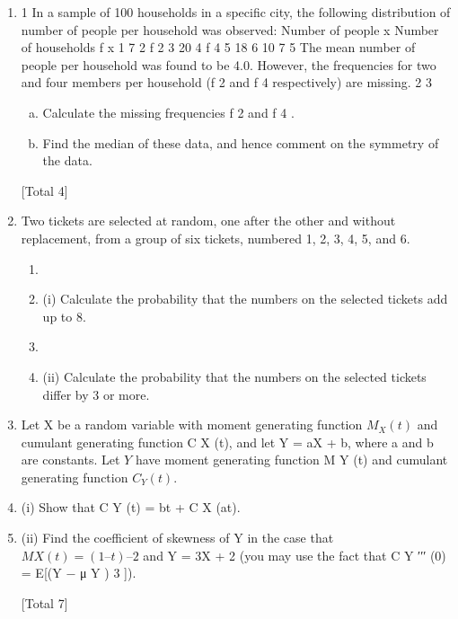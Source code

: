 \documentclass[a4paper,12pt]{article}
\begin{document}
\begin{enumerate}
\item 1
In a sample of 100 households in a specific city, the following distribution of number of people per household was observed:
Number of people x
Number of households f x
1
7
2
f 2
3
20
4
f 4
5
18
6
10
7
5
The mean number of people per household was found to be 4.0. However, the
frequencies for two and four members per household (f 2 and f 4 respectively) are
missing.
2
3

\begin{enumerate}[(a)]
\item Calculate the missing frequencies f 2 and f 4 .
\item Find the median of these data, and hence comment on the symmetry of the
data.
\end{enumerate}
[Total 4]
\item Two tickets are selected at random, one after the other and without replacement, from a group of six tickets, numbered 1, 2, 3, 4, 5, and 6.
\begin{enumerate}[\item (i)]
\item \item (i) Calculate the probability that the numbers on the selected tickets add up to 8.
\item 
\item (ii) Calculate the probability that the numbers on the selected tickets differ by
3 or more.
\end{enumerate}
\item Let X be a random variable with moment generating function $M_X (t)$ and cumulant generating function C X (t), and let Y = aX + b, where a and b are constants. Let $Y$ have moment generating function M Y (t) and cumulant generating function $C_Y (t)$.
\item (i) Show that C Y (t) = bt + C X (at).
\item (ii) Find the coefficient of skewness of Y in the case that $M X (t) = (1 – t) –2$ and
Y = 3X + 2 (you may use the fact that C Y ′′′ (0) = E[(Y − μ Y ) 3 ]).


[Total 7]



\end{enumerate}
\end{document}
